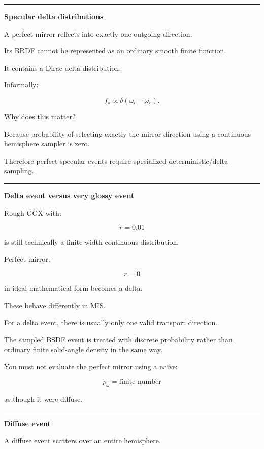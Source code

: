 \begin{center}\rule{0.5\linewidth}{0.5pt}\end{center}

\textbf{Specular delta distributions}

A perfect mirror reflects into exactly one outgoing direction.

Its BRDF cannot be represented as an ordinary smooth finite function.

It contains a Dirac delta distribution.

Informally:

\[
f_s
\propto
\delta(
\omega_i-\omega_r
).
\]

Why does this matter?

Because probability of selecting exactly the mirror direction using a continuous hemisphere sampler is zero.

Therefore perfect-specular events require specialized deterministic/delta sampling.

\begin{center}\rule{0.5\linewidth}{0.5pt}\end{center}

\textbf{Delta event versus very glossy event}

Rough GGX with:

\[
r=0.01
\]

is still technically a finite-width continuous distribution.

Perfect mirror:

\[
r=0
\]

in ideal mathematical form becomes a delta.

These behave differently in MIS.

For a delta event, there is usually only one valid transport direction.

The sampled BSDF event is treated with discrete probability rather than ordinary finite solid-angle density in the same way.

You must not evaluate the perfect mirror using a naïve:

\[
p_\omega=\text{finite number}
\]

as though it were diffuse.

\begin{center}\rule{0.5\linewidth}{0.5pt}\end{center}

\textbf{Diffuse event}

A diffuse event scatters over an entire hemisphere.

